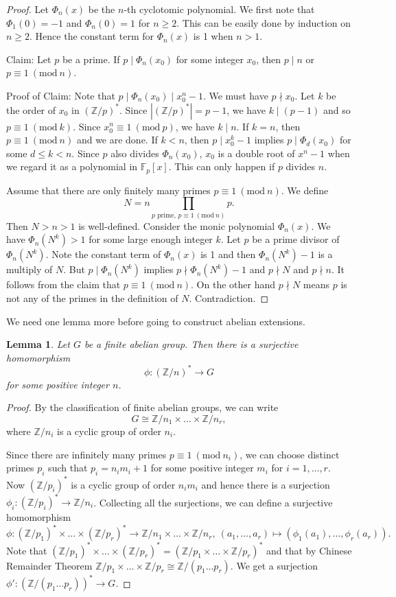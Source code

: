 \documentclass[12pt]{report}
\newtheorem{lemma}[theorem]{Lemma}
\theoremstyle{definition}
\newcommand{\Mod}[1]{\ (\mathrm{mod}\ #1)}
\newcommand{\zz}{\mathbb{Z}}
\newcommand{\ff}{\mathbb{F}}
\begin{document}
\begin{proof}
	Let $\Phi_n(x)$ be the $n$-th cyclotomic polynomial.
	We first note that $\Phi_1(0)=-1$ and $\Phi_n(0)=1$ for $n\geq 2$. This can be easily done by induction on $n\geq 2$. Hence the constant term for $\Phi_n(x)$ is 1 when $n>1$.

	Claim: Let $p$ be a prime. If $p\mid \Phi_n(x_0)$ for some integer $x_0$, then $p\mid n$ or $p\equiv 1\Mod{n}$.


	Proof of Claim: Note that $p\mid \Phi_n(x_0)\mid x_0^n-1$. We must have $p\nmid x_0$. Let $k$ be the order of $x_0$ in $(\zz/p)^*$. Since $|(\zz/p)^*|=p-1$, we have $k\mid (p-1)$ and so $p\equiv 1\Mod{k}$. Since $x_0^n\equiv 1\Mod{p}$, we have $k\mid n$. If $k=n$, then $p\equiv 1\Mod{n}$ and we are done. If $k<n$, then $p\mid x_0^k-1$ implies $p\mid \Phi_d(x_0)$ for some $d\leq k<n$. Since $p$ also divides $\Phi_n(x_0)$, $x_0$ is a double root of $x^n-1$ when we regard it as a polynomial in $\ff_p[x]$. This can only happen if $p$ divides $n$.


	Assume that there are only finitely many primes $p\equiv 1\Mod{n}$. We define \[N=n\prod_{p \text{ prime, } p\equiv 1\Mod{n}} p.\] Then $N>n>1$ is well-defined. Consider the monic polynomial $\Phi_n(x)$. We have $\Phi_n(N^k)>1$ for some large enough integer $k$. Let $p$ be a prime divisor of $\Phi_n(N^k)$. Note the constant term of $\Phi_n(x)$ is 1 and then $\Phi_n(N^k)-1$ is a multiply of $N$. But $p\mid \Phi_n(N^k)$ implies $p\nmid \Phi_n(N^k)-1 $ and $p\nmid N$ and $p\nmid n$. It follows from the claim that $p\equiv 1\Mod{n}$. On the other hand $p\nmid N$ means $p$ is not any of the primes in the definition of $N$. Contradiction.
\end{proof}

We need one lemma more before going to construct abelian extensions.

\begin{lemma}
	Let $G$ be a finite abelian group. Then there is a surjective homomorphism $$\phi:(\zz/n)^*\to G$$ for some positive integer $n$.
\end{lemma}

\begin{proof}
	By the classification of finite abelian groups, we can write \[G\cong \zz/n_1\times\dots\times\zz/n_r,\] where $\zz/n_i$ is a cyclic group of order $n_i$.

	Since there are infinitely many primes $p\equiv 1\Mod{n_i}$, we can choose distinct primes $p_i$ such that $p_i=n_im_i+1$ for some positive integer $m_i$ for $i=1,\dots,r$. Now $(\zz/p_i)^*$ is a cyclic group of order $n_im_i$ and hence there is a surjection $\phi_i: (\zz/p_i)^* \to \zz/n_i$. Collecting all the surjections, we can define a surjective homomorphism
	\[\phi:(\zz/p_1)^*\times\dots\times (\zz/p_r)^*\to \zz/n_1\times\dots\times\zz/n_r,~ (a_1,\dots,a_r)\mapsto (\phi_1(a_1),\dots,\phi_r(a_r)).\]
	Note that $(\zz/p_1)^*\times\dots\times (\zz/p_r)^* = (\zz/p_1\times\dots\times \zz/p_r)^*$ and that by Chinese Remainder Theorem $\zz/p_1\times\dots\times \zz/p_r \cong \zz/(p_1\dots p_r)$. We get a surjection $\phi': (\zz/(p_1\dots p_r))^*\to G.$
\end{proof}
\end{document}

